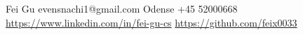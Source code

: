 \documentclass[grey]{hipstercv}
\makeatletter
\newlength{\rightcolwidth}
\newcommand{\myName}{Fei Gu}
\newcommand{\email}{evensnachi1@gmail.com}
\newcommand{\tel}{+45 52000668}
\newcommand{\linkedin}{https://www.linkedin.com/in/fei-gu-cs}
\newcommand{\github}{https://github.com/feix0033}
\makeatother
\begin{document}
\begin{paracol}{2}









\vfill{} %

\setlength{\parindent}{0pt}
\begin{minipage}[t]{\rightcolwidth}
\begin{center}\fontfamily{\sfdefault}\selectfont \color{black!70}
{\small \myName {} \email {} Odense  \tel \newline{} \protect\url{\linkedin}  \protect\url{\github}
}
\end{center}
\end{minipage}


\end{paracol}
\end{document}
